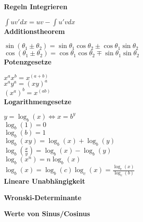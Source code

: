 \documentclass[10pt,twocolumn,a4paper]{article}
\begin{document}
\begin{flushleft}
\textbf{Regeln Integrieren}

$\int {uv'} dx = uv - \int {u'v}dx$\\

\textbf{Additionstheorem}

$\sin \left( {\theta _1  \pm \theta _2 } \right) = \sin \theta _1 \cos \theta _2  \pm \cos \theta _1 \sin \theta _2$\\
$\cos \left( {\theta _1  \pm \theta _2 } \right) = \cos \theta _1 \cos \theta _2  \mp \sin \theta _1 \sin \theta _2$\\

\textbf{Potenzgesetze}

$x^a x^b  = x^{\left( {a + b} \right)}$\\
$x^a y^a  = \left( {xy} \right)^a$\\
$\left( {x^a } \right)^b  = x^{\left( {ab} \right)}$\\

\textbf{Logarithmengesetze}

$y = \log _b \left( x \right) \Leftrightarrow x = b^y$\\
$\log _b \left( 1 \right) = 0$\\
$\log _b \left( b \right) = 1$\\
$\log _b \left( {xy} \right) = \log _b \left( x \right) + \log _b \left( y \right)$\\
$\log _b \left( {\frac{x}{y}} \right) = \log _b \left( x \right) - \log _b \left( y \right)$\\
$\log _b \left( {x^n } \right) = n\log _b \left( x \right)$\\
$\log _b \left( x \right) = \log _b \left( c \right)\log _c \left( x \right) = \frac{{\log _c \left( x \right)}}{{\log _c \left( b \right)}}$\\

\textbf{Lineare Unabhängigkeit}

\textbf{Wronski-Determinante}


\textbf{Werte von Sinus/Cosinus}


\end{flushleft}
\end{document}
